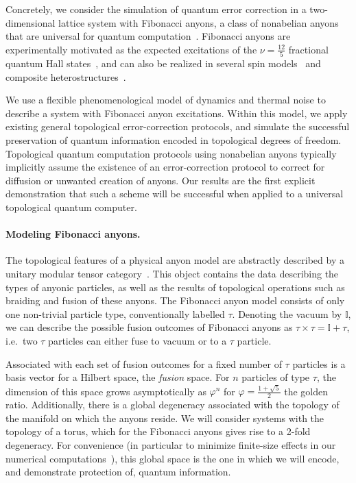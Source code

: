 \documentclass[aps, prl, letterpaper, twocolumn, superscriptaddress, notitlepage, 10pt]{revtex4-1}
\begin{document}
Concretely, we consider the simulation of quantum error correction in a two-dimensional lattice 
system with Fibonacci anyons, a class of nonabelian anyons that are universal for quantum 
computation~\cite{Freedman2002, Nayak2008}. Fibonacci anyons are experimentally motivated as the 
expected excitations of the $\nu=\frac{12}{5}$ fractional quantum Hall 
states~\cite{Slingerland2001}, and can also be realized in several spin 
models~\cite{Levin2005, Bonesteel2012, Kapit2013, Palumbo2014} and composite 
heterostructures~\cite{Mong2014}.

We use a flexible phenomenological model of dynamics and thermal noise to describe a system with Fibonacci anyon excitations. Within this model, we apply existing general topological error-correction protocols, and simulate the successful preservation of quantum information encoded in topological degrees of freedom. Topological quantum computation protocols using nonabelian anyons typically implicitly assume the existence of an error-correction protocol to correct for diffusion or unwanted creation of anyons. Our results are the first explicit demonstration that such a scheme will be successful when applied to a universal topological quantum computer.

\paragraph{Modeling Fibonacci anyons.}

The topological features of a physical anyon model are abstractly described by a unitary 
modular tensor category~\cite{Wang2010b}. This object contains the data describing the 
types of anyonic particles, as well as the results of topological operations such as braiding and 
fusion of these anyons. The Fibonacci anyon model consists of only one non-trivial particle 
type, conventionally labelled $\tau$. Denoting the vacuum by $\mathbb{I}$, we can describe 
the possible fusion outcomes of Fibonacci anyons as $\tau\times\tau=\mathbb{I}+\tau$, 
i.e.~two $\tau$ particles can either fuse to vacuum or to a $\tau$ particle.

Associated with each set of fusion outcomes for a fixed number of $\tau$ particles is a basis 
vector for a Hilbert space, the \emph{fusion} space. For $n$ particles of type $\tau$, the 
dimension of this space grows asymptotically as $\varphi^n$ for $\varphi=\frac{1+\sqrt{5}}{2}$ 
the golden ratio. Additionally, there is a global degeneracy associated with the topology of the 
manifold on which the anyons reside. We will consider systems with the topology of a torus, 
which for the Fibonacci anyons gives rise to a 2-fold degeneracy. For convenience 
(in particular to minimize finite-size effects in our numerical computations~\cite{Brell2013}), 
this global space is the one in which we will encode, and demonstrate protection of, quantum 
information.
\end{document}

